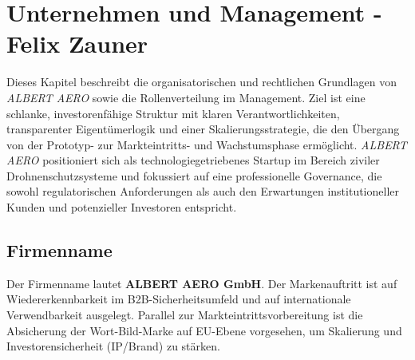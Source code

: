 \documentclass[11pt,a4paper]{article}
\begin{document}



\section{Unternehmen und Management - Felix Zauner}
\label{sec:unternehmen-management}

Dieses Kapitel beschreibt die organisatorischen und rechtlichen Grundlagen von \textit{ALBERT AERO} sowie die Rollenverteilung im Management. Ziel ist eine schlanke, investorenfähige Struktur mit klaren Verantwortlichkeiten, transparenter Eigentümerlogik und einer Skalierungsstrategie, die den Übergang von der Prototyp- zur Markteintritts- und Wachstumsphase ermöglicht. \textit{ALBERT AERO} positioniert sich als technologiegetriebenes Startup im Bereich ziviler Drohnenschutzsysteme und fokussiert auf eine professionelle Governance, die sowohl regulatorischen Anforderungen als auch den Erwartungen institutioneller Kunden und potenzieller Investoren entspricht.

\subsection{Firmenname}
Der Firmenname lautet \textbf{ALBERT AERO GmbH}. Der Markenauftritt ist auf Wiedererkennbarkeit im B2B-Sicherheitsumfeld und auf internationale Verwendbarkeit ausgelegt. Parallel zur Markteintrittsvorbereitung ist die Absicherung der Wort-Bild-Marke auf EU-Ebene vorgesehen, um Skalierung und Investorensicherheit (IP/Brand) zu stärken.
\end{document}
